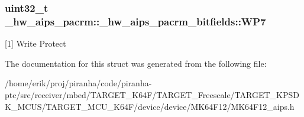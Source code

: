 \subsubsection[{\texorpdfstring{W\+P7}{WP7}}]{\setlength{\rightskip}{0pt plus 5cm}uint32\+\_\+t \+\_\+hw\+\_\+aips\+\_\+pacrm\+::\+\_\+hw\+\_\+aips\+\_\+pacrm\+\_\+bitfields\+::\+W\+P7}\hypertarget{struct__hw__aips__pacrm_1_1__hw__aips__pacrm__bitfields_a78c9c1069b39d7aad2cae115913ce014}{}\label{struct__hw__aips__pacrm_1_1__hw__aips__pacrm__bitfields_a78c9c1069b39d7aad2cae115913ce014}
\mbox{[}1\mbox{]} Write Protect 

The documentation for this struct was generated from the following file\+:\begin{DoxyCompactItemize}
\item 
/home/erik/proj/piranha/code/piranha-\/ptc/src/receiver/mbed/\+T\+A\+R\+G\+E\+T\+\_\+\+K64\+F/\+T\+A\+R\+G\+E\+T\+\_\+\+Freescale/\+T\+A\+R\+G\+E\+T\+\_\+\+K\+P\+S\+D\+K\+\_\+\+M\+C\+U\+S/\+T\+A\+R\+G\+E\+T\+\_\+\+M\+C\+U\+\_\+\+K64\+F/device/device/\+M\+K64\+F12/M\+K64\+F12\+\_\+aips.\+h\end{DoxyCompactItemize}
